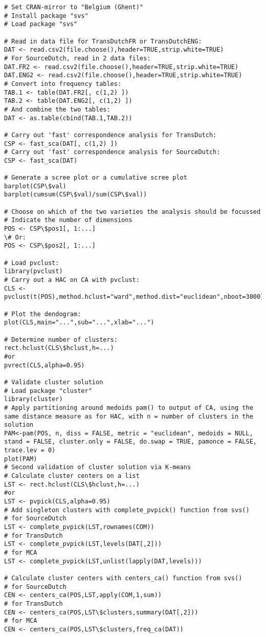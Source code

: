 \begin{lstlisting}[style=RStyle]
# Set CRAN-mirror to "Belgium (Ghent)"
# Install package "svs"
# Load package "svs"

# Read in data file for TransDutchFR or TransDutchENG:
DAT <- read.csv2(file.choose(),header=TRUE,strip.white=TRUE)
# For SourceDutch, read in 2 data files:
DAT.FR2 <- read.csv2(file.choose(),header=TRUE,strip.white=TRUE)
DAT.ENG2 <- read.csv2(file.choose(),header=TRUE,strip.white=TRUE)
# Convert into frequency tables:
TAB.1 <- table(DAT.FR2[, c(1,2) ])
TAB.2 <- table(DAT.ENG2[, c(1,2) ])
# And combine the two tables:
DAT <- as.table(cbind(TAB.1,TAB.2))

# Carry out 'fast' correspondence analysis for TransDutch:
CSP <- fast_sca(DAT[, c(1,2) ])
# Carry out 'fast' correspondence analysis for SourceDutch:
CSP <- fast_sca(DAT)

# Generate a scree plot or a cumulative scree plot
barplot(CSP\$val)
barplot(cumsum(CSP\$val)/sum(CSP\$val))

# Choose on which of the two varieties the analysis should be focussed
# Indicate the number of dimensions
POS <- CSP\$pos1[, 1:...]
\# Or:
POS <- CSP\$pos2[, 1:...]

# Load pvclust:
library(pvclust)
# Carry out a HAC on CA with pvclust:
CLS <- pvclust(t(POS),method.hclust="ward",method.dist="euclidean",nboot=3000)

# Plot the dendogram:
plot(CLS,main="...",sub="...",xlab="...")

# Determine number of clusters:
rect.hclust(CLS\$hclust,h=...)
#or
pvrect(CLS,alpha=0.95)

# Validate cluster solution
# Load package "cluster"
library(cluster)
# Apply partitioning around medoids pam() to output of CA, using the same distance measure as for HAC, with n = number of clusters in the solution
PAM<-pam(POS, n, diss = FALSE, metric = "euclidean", medoids = NULL, stand = FALSE, cluster.only = FALSE, do.swap = TRUE, pamonce = FALSE, trace.lev = 0)
plot(PAM)
# Second validation of cluster solution via K-means
# Calculate cluster centers on a list
LST <- rect.hclust(CLS\$hclust,h=...)
#or
LST <- pvpick(CLS,alpha=0.95) 
# Add singleton clusters with complete_pvpick() function from svs()
# for SourceDutch
LST <- complete_pvpick(LST,rownames(COM))
# for TransDutch
LST <- complete_pvpick(LST,levels(DAT[,2]))
# for MCA
LST <- complete_pvpick(LST,unlist(lapply(DAT,levels)))

# Calculate cluster centers with centers_ca() function from svs()
# for SourceDutch
CEN <- centers_ca(POS,LST,apply(COM,1,sum))
# for TransDutch
CEN <- centers_ca(POS,LST\$clusters,summary(DAT[,2]))
# for MCA
CEN <- centers_ca(POS,LST\$clusters,freq_ca(DAT))


\end{lstlisting}
